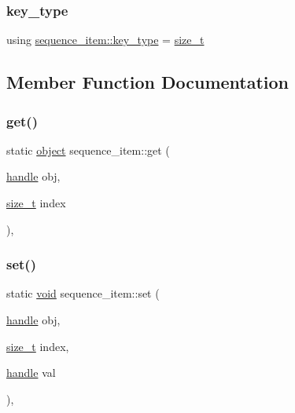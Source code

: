 \subsubsection{\texorpdfstring{key\_type}{key\_type}}
{\footnotesize\ttfamily using \mbox{\hyperlink{structsequence__item_a87cb414345251dca7dc372dfac88bdc4}{sequence\+\_\+item\+::key\+\_\+type}} =  \mbox{\hyperlink{detail_2common_8h_a801d6a451a01953ef8cbae6feb6a3638}{size\+\_\+t}}}



\subsection{Member Function Documentation}
\mbox{\label{structsequence__item_a1fe9bd4ca1289023d16bdd9184158d2f}} 
\subsubsection{\texorpdfstring{get()}{get()}}
{\footnotesize\ttfamily static \mbox{\hyperlink{classobject}{object}} sequence\+\_\+item\+::get (\begin{DoxyParamCaption}\item[{\mbox{\hyperlink{classhandle}{handle}}}]{obj,  }\item[{\mbox{\hyperlink{detail_2common_8h_a801d6a451a01953ef8cbae6feb6a3638}{size\+\_\+t}}}]{index }\end{DoxyParamCaption})\hspace{0.3cm}{\ttfamily [inline]}, {\ttfamily [static]}}

\mbox{\label{structsequence__item_aee77098b776b17d7d237d5eb750bf735}} 
\subsubsection{\texorpdfstring{set()}{set()}}
{\footnotesize\ttfamily static \mbox{\hyperlink{_s_d_l__opengles2__gl2ext_8h_ae5d8fa23ad07c48bb609509eae494c95}{void}} sequence\+\_\+item\+::set (\begin{DoxyParamCaption}\item[{\mbox{\hyperlink{classhandle}{handle}}}]{obj,  }\item[{\mbox{\hyperlink{detail_2common_8h_a801d6a451a01953ef8cbae6feb6a3638}{size\+\_\+t}}}]{index,  }\item[{\mbox{\hyperlink{classhandle}{handle}}}]{val }\end{DoxyParamCaption})\hspace{0.3cm}{\ttfamily [inline]}, {\ttfamily [static]}}



